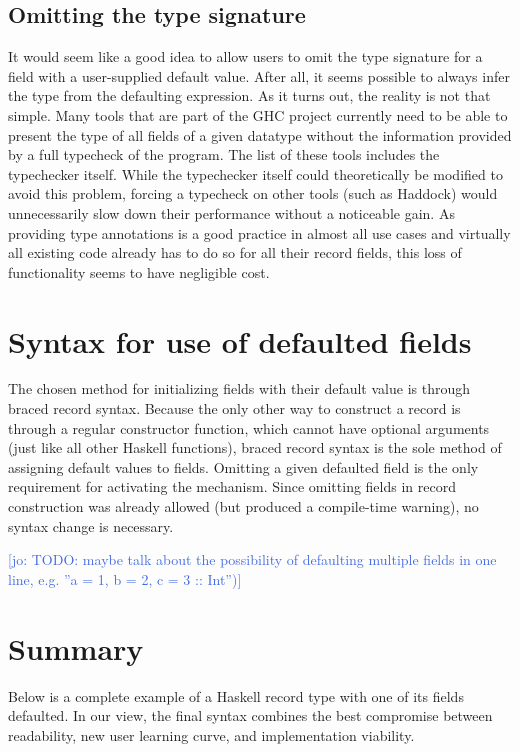 \documentclass[en]{pracamgr}
\newcommand{\jcom}[1]{\textcolor{RoyalBlue}{[jo: #1]}}
\begin{document}
\subsection{Omitting the type signature}
It would seem like a good idea to allow users to omit the type signature for a field with a user-supplied default value.
After all, it seems possible to always infer the type from the defaulting expression.
As it turns out, the reality is not that simple.
Many tools that are part of the GHC project currently need to be able to present the type of all fields of a given datatype without the information provided by a full typecheck of the program.
The list of these tools includes the typechecker itself.
While the typechecker itself could theoretically be modified to avoid this problem, forcing a typecheck on other tools (such as Haddock) would unnecessarily slow down their performance without a noticeable gain.
As providing type annotations is a good practice in almost all use cases and virtually all existing code already has to do so for all their record fields, this loss of functionality seems to have negligible cost.


\section{Syntax for use of defaulted fields}

The chosen method for initializing fields with their default value is through braced record syntax.
Because the only other way to construct a record is through a regular constructor function, which cannot have optional arguments (just like all other Haskell functions), braced record syntax is the sole method of assigning default values to fields.
Omitting a given defaulted field is the only requirement for activating the mechanism. 
Since omitting fields in record construction was already allowed (but produced a compile-time warning), no syntax change is necessary.

\jcom{TODO: maybe talk about the possibility of defaulting multiple fields in one line, e.g. ''a = 1, b = 2, c = 3 :: Int'')}

\section{Summary}
Below is a complete example of a Haskell record type with one of its fields defaulted. 
In our view, the final syntax combines the best compromise between readability, new user learning curve, and implementation viability.
\end{document}
